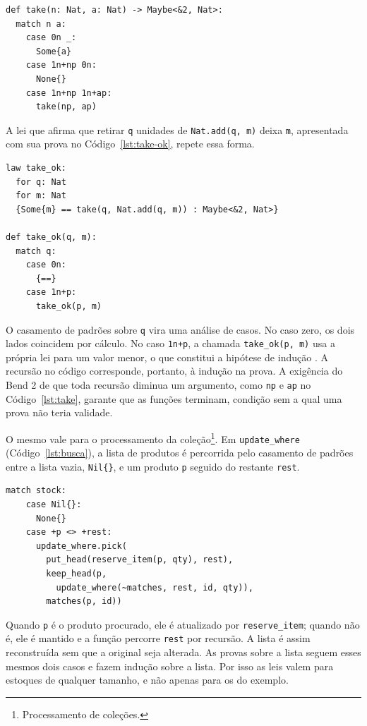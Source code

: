 \begin{lstlisting}[caption={Validação da quantidade.},label={lst:take}]
def take(n: Nat, a: Nat) -> Maybe<&2, Nat>:
  match n a:
    case 0n _:
      Some{a}
    case 1n+np 0n:
      None{}
    case 1n+np 1n+ap:
      take(np, ap)
\end{lstlisting}

A lei que afirma que retirar \texttt{q} unidades de \texttt{Nat.add(q, m)} deixa \texttt{m}, apresentada com sua prova no Código~\ref{lst:take-ok}, repete essa forma.

\begin{lstlisting}[caption={Lei sobre \texttt{take} e sua prova.},label={lst:take-ok}]
law take_ok:
  for q: Nat
  for m: Nat
  {Some{m} == take(q, Nat.add(q, m)) : Maybe<&2, Nat>}

def take_ok(q, m):
  match q:
    case 0n:
      {==}
    case 1n+p:
      take_ok(p, m)
\end{lstlisting}

O casamento de padrões sobre \texttt{q} vira uma análise de casos. No caso zero, os dois lados coincidem por cálculo. No caso \texttt{1n+p}, a chamada \texttt{take\_ok(p, m)} usa a própria lei para um valor menor, o que constitui a hipótese de indução \cite{BendLearn}. A recursão no código corresponde, portanto, à indução na prova. A exigência do Bend 2 de que toda recursão diminua um argumento, como \texttt{np} e \texttt{ap} no Código~\ref{lst:take}, garante que as funções terminam, condição sem a qual uma prova não teria validade.

O mesmo vale para o processamento da coleção\footnote{Processamento de coleções.}. Em \texttt{update\_where} (Código~\ref{lst:busca}), a lista de produtos é percorrida pelo casamento de padrões entre a lista vazia, \texttt{Nil\{\}}, e um produto \texttt{p} seguido do restante \texttt{rest}.

\begin{lstlisting}[caption={Percurso da lista na busca.},label={lst:busca}]
  match stock:
    case Nil{}:
      None{}
    case +p <> +rest:
      update_where.pick(
        put_head(reserve_item(p, qty), rest),
        keep_head(p,
          update_where(~matches, rest, id, qty)),
        matches(p, id))
\end{lstlisting}

Quando \texttt{p} é o produto procurado, ele é atualizado por \texttt{reserve\_item}; quando não é, ele é mantido e a função percorre \texttt{rest} por recursão. A lista é assim reconstruída sem que a original seja alterada. As provas sobre a lista seguem esses mesmos dois casos e fazem indução sobre a lista. Por isso as leis valem para estoques de qualquer tamanho, e não apenas para os do exemplo.

